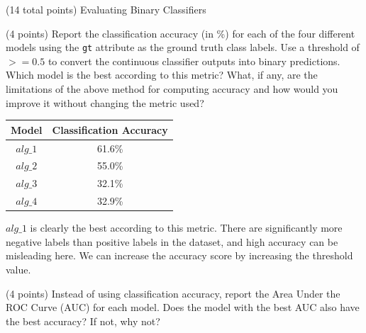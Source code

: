 \documentclass[12pt]{article}
\begin{document}
\begin{question}{(14 total points) Evaluating Binary Classifiers}





%
%
\begin{subquestion}{(4 points) Report the classification accuracy (in \%) for each of the four different models using the \texttt{gt} attribute as the ground truth class labels. 
Use a threshold of $>= 0.5$ to convert the continuous classifier outputs into binary predictions. 
Which model is the best according to this metric?
What, if any, are the limitations of the above method for computing accuracy and how would you improve it without changing the metric used?
}


\begin{answerbox}{15em}
\begin{center}
    \begin{tabular}{|c|c|}
    \hline
    Model & Classification Accuracy \\ \hline
    $alg\_1$ & 61.6\% \\
    $alg\_2$ & 55.0\% \\
    $alg\_3$ & 32.1\% \\
    $alg\_4$ & 32.9\% \\
    \hline
    \end{tabular}
\end{center}
$alg\_1$ is clearly the best according to this metric. There are significantly more negative labels than positive labels in the dataset, and high accuracy can be misleading here. We can increase the accuracy score by increasing the threshold value.
\end{answerbox}



\end{subquestion}



%
%
\begin{subquestion}{(4 points) Instead of using classification accuracy, report the Area Under the ROC Curve (AUC) for each model. 
Does the model with the best AUC also have the best accuracy? If not, why not?\\
}



\end{subquestion}
\end{question}
\end{document}
